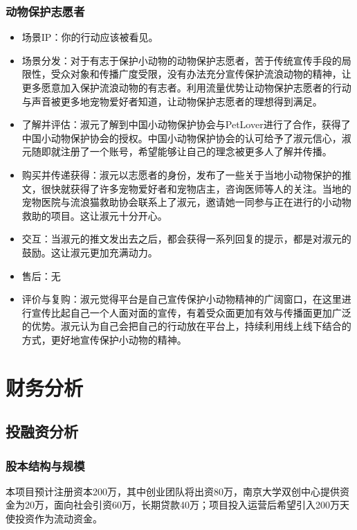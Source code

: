 \documentclass[a4paper]{ctexart}
\begin{document}
\subsubsection{动物保护志愿者}
\begin{itemize}
  \item 场景IP：你的行动应该被看见。
  \item 场景分发：对于有志于保护小动物的动物保护志愿者，苦于传统宣传手段的局限性，受众对象和传播广度受限，没有办法充分宣传保护流浪动物的精神，让更多愿意加入保护流浪动物的有志者。利用流量优势让动物保护志愿者的行动与声音被更多地宠物爱好者知道，让动物保护志愿者的理想得到满足。
  \item 了解并评估：淑元了解到中国小动物保护协会与PetLover进行了合作，获得了中国小动物保护协会的授权。中国小动物保护协会的认可给予了淑元信心，淑元随即就注册了一个账号，希望能够让自己的理念被更多人了解并传播。
  \item 购买并传递获得：淑元以志愿者的身份，发布了一些关于当地小动物保护的推文，很快就获得了许多宠物爱好者和宠物店主，咨询医师等人的关注。当地的宠物医院与流浪猫救助协会联系上了淑元，邀请她一同参与正在进行的小动物救助的项目。这让淑元十分开心。
  \item 交互：当淑元的推文发出去之后，都会获得一系列回复的提示，都是对淑元的鼓励。这让淑元更加充满动力。
  \item 售后：无
  \item 评价与复购：淑元觉得平台是自己宣传保护小动物精神的广阔窗口，在这里进行宣传比起自己一个人面对面的宣传，有着受众面更加有效与传播面更加广泛的优势。淑元认为自己会把自己的行动放在平台上，持续利用线上线下结合的方式，更好地宣传保护小动物的精神。
\end{itemize}

\section{财务分析}

\subsection{投融资分析}

\subsubsection{股本结构与规模}

本项目预计注册资本200万，其中创业团队将出资80万，南京大学双创中心提供资金为20万，面向社会引资60万，长期贷款40万；项目投入运营后希望引入200万天使投资作为流动资金。
\end{document}

